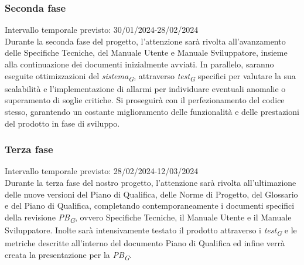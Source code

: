 \subsubsection{Seconda fase}
Intervallo temporale previsto: 30/01/2024-28/02/2024
\\ 
\vspace{0.2cm} 
Durante la seconda fase del progetto, l'attenzione sarà rivolta all'avanzamento delle Specifiche Tecniche, del Manuale Utente e Manuale Sviluppatore, insieme alla continuazione dei documenti inizialmente avviati. In parallelo, saranno eseguite ottimizzazioni del \textit{sistema}\textsubscript{\textit{G}}, attraverso \textit{test}\textsubscript{\textit{G}} specifici per valutare la sua scalabilità e l'implementazione di allarmi per individuare eventuali anomalie o superamento di soglie critiche. Si proseguirà con il perfezionamento del codice stesso, garantendo un costante miglioramento delle funzionalità e delle prestazioni del prodotto in fase di sviluppo.

\subsubsection{Terza fase}
Intervallo temporale previsto: 28/02/2024-12/03/2024\\ 
\vspace{0.2cm} 
Durante la terza fase del nostro progetto, l'attenzione sarà rivolta all'ultimazione delle nuove versioni del Piano di Qualifica, delle Norme di Progetto, del Glossario e del Piano di Qualifica, completando contemporaneamente i documenti specifici della revisione \textit{PB}\textsubscript{\textit{G}}, ovvero Specifiche Tecniche, il Manuale Utente e il Manuale Sviluppatore. Inolte sarà intensivamente testato il prodotto attraverso i \textit{test}\textsubscript{\textit{G}} e le metriche descritte all'interno del documento Piano di Qualifica ed infine verrà creata la presentazione per la \textit{PB}\textsubscript{\textit{G}}.
